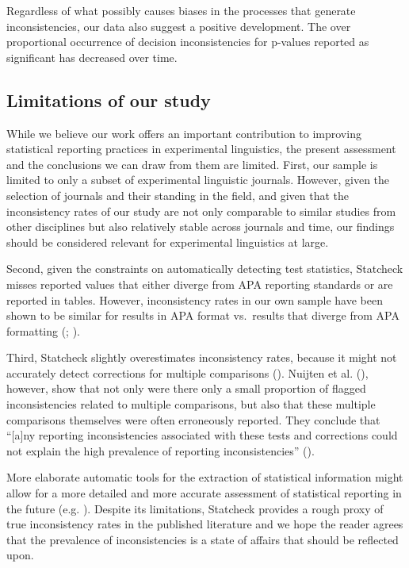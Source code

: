 \documentclass[
  doc,
  longtable,
  nolmodern,
  notxfonts,
  notimes,
  colorlinks=true,linkcolor=blue,citecolor=blue,urlcolor=blue]{apa7}
\begin{document}
Regardless of what possibly causes biases in the processes that generate
inconsistencies, our data also suggest a positive development. The over
proportional occurrence of decision inconsistencies for p-values
reported as significant has decreased over time.

\subsection{Limitations of our study}\label{limitations-of-our-study}

While we believe our work offers an important contribution to improving
statistical reporting practices in experimental linguistics, the present
assessment and the conclusions we can draw from them are limited. First,
our sample is limited to only a subset of experimental linguistic
journals. However, given the selection of journals and their standing in
the field, and given that the inconsistency rates of our study are not
only comparable to similar studies from other disciplines but also
relatively stable across journals and time, our findings should be
considered relevant for experimental linguistics at large.

Second, given the constraints on automatically detecting test
statistics, Statcheck misses reported values that either diverge from
APA reporting standards or are reported in tables. However,
inconsistency rates in our own sample have been shown to be similar for
results in APA format vs.~results that diverge from APA formatting
(;
).

Third, Statcheck slightly overestimates inconsistency rates, because it
might not accurately detect corrections for multiple comparisons
(). Nuijten et al.
(), however, show that not only
were there only a small proportion of flagged inconsistencies related to
multiple comparisons, but also that these multiple comparisons
themselves were often erroneously reported. They conclude that
``{[}a{]}ny reporting inconsistencies associated with these tests and
corrections could not explain the high prevalence of reporting
inconsistencies'' ().

More elaborate automatic tools for the extraction of statistical
information might allow for a more detailed and more accurate assessment
of statistical reporting in the future (e.g.
). Despite its
limitations, Statcheck provides a rough proxy of true inconsistency
rates in the published literature and we hope the reader agrees that the
prevalence of inconsistencies is a state of affairs that should be
reflected upon.
\end{document}
